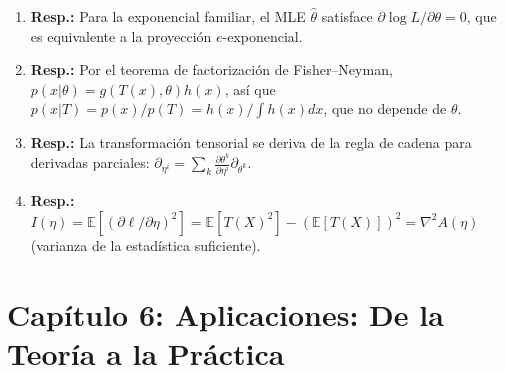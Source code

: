 \begin{enumerate}
	\item \textbf{Resp.:} Para la exponencial familiar, el MLE $\hat\theta$ satisface $\partial \log L / \partial \theta = 0$, que es equivalente a la proyección $e$-exponencial.
	\item \textbf{Resp.:} Por el teorema de factorización de Fisher--Neyman, $p(x|\theta) = g(T(x), \theta) h(x)$, así que $p(x|T) = p(x)/p(T) = h(x)/\int h(x)dx$, que no depende de $\theta$.
	\item \textbf{Resp.:} La transformación tensorial se deriva de la regla de cadena para derivadas parciales: $\partial_{\eta^i} = \sum_k \frac{\partial\theta^k}{\partial\eta^i} \partial_{\theta^k}$.
	\item \textbf{Resp.:} $I(\eta) = \mathbb{E}[(\partial \ell / \partial \eta)^2] = \mathbb{E}[T(X)^2] - (\mathbb{E}[T(X)])^2 = \nabla^2 A(\eta)$ (varianza de la estadística suficiente).
\end{enumerate}

\section*{Capítulo 6: Aplicaciones: De la Teoría a la Práctica}

